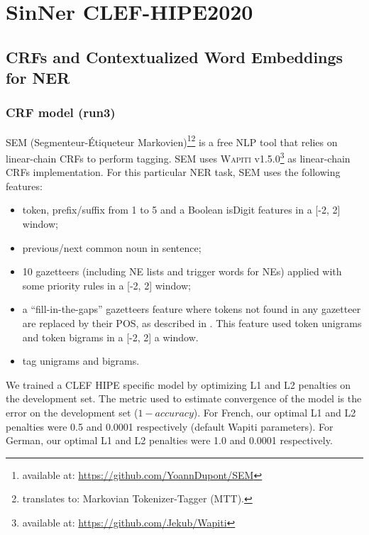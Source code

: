 \chapter{SinNer CLEF-HIPE2020}

\section{CRFs and Contextualized Word Embeddings for NER}
\label{sec:method}


\subsection{CRF model (run3)}

SEM (Segmenteur-Étiqueteur Markovien)\footnote{available at: \url{https://github.com/YoannDupont/SEM}}\footnote{translates to: Markovian Tokenizer-Tagger (MTT).} \cite{dupont-2017-exploration} is a free NLP tool that relies on linear-chain CRFs \cite{lafferty-etal-2001-conditional} to perform tagging. SEM uses \textsc{Wapiti} \cite{lavergne-etal-2010-practical} v1.5.0\footnote{available at: \url{https://github.com/Jekub/Wapiti}} as linear-chain CRFs implementation. For this particular NER task, SEM uses the following features:
\begin{itemize}
    \item token, prefix/suffix from 1 to 5 and a Boolean isDigit features in a [-2, 2] window; %
    \item previous/next common noun in sentence;
    \item 10 gazetteers (including NE lists and trigger words for NEs) applied with some priority rules in a [-2, 2] window;
    \item a ``fill-in-the-gaps'' gazetteers feature where tokens not found in any gazetteer are replaced by their POS, as described in \cite{raymond-fayolle-2010-reconnaissance}. This feature used token unigrams and token bigrams in a [-2, 2] a window.
    \item tag unigrams and bigrams.
\end{itemize}

We trained a CLEF HIPE specific model by optimizing L1 and L2 penalties on the development set. The metric used to estimate convergence of the model is the error on the development set ($1 - accuracy$).
For French, our optimal L1 and L2 penalties were 0.5 and 0.0001 respectively (default Wapiti parameters).
For German, our optimal L1 and L2 penalties were 1.0 and 0.0001 respectively.

